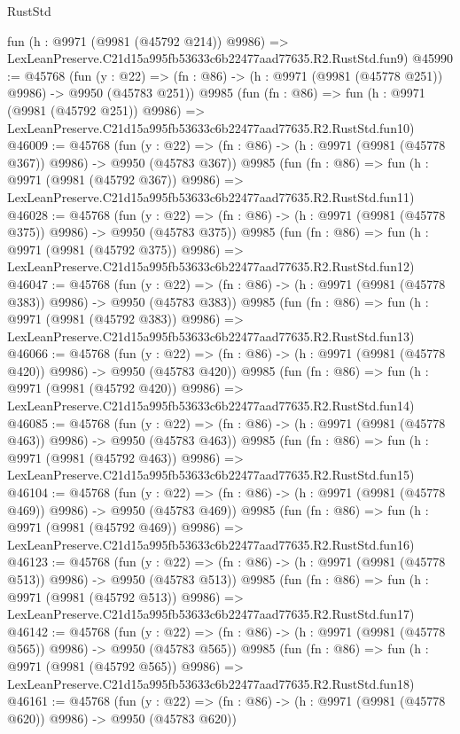 \begin{lexlean}{RustStd}
\begin{coremodule}
    fun (h : @9971 (@9981 (@45792 @214)) @9986) =>
    LexLeanPreserve.C21d15a995fb53633c6b22477aad77635.R2.RustStd.fun9)
@45990 := @45768
    (fun (y : @22) => (fn : @86) -> (h : @9971 (@9981 (@45778 @251)) @9986) -> @9950 (@45783 @251))
    @9985
    (fun (fn : @86) =>
    fun (h : @9971 (@9981 (@45792 @251)) @9986) =>
    LexLeanPreserve.C21d15a995fb53633c6b22477aad77635.R2.RustStd.fun10)
@46009 := @45768
    (fun (y : @22) => (fn : @86) -> (h : @9971 (@9981 (@45778 @367)) @9986) -> @9950 (@45783 @367))
    @9985
    (fun (fn : @86) =>
    fun (h : @9971 (@9981 (@45792 @367)) @9986) =>
    LexLeanPreserve.C21d15a995fb53633c6b22477aad77635.R2.RustStd.fun11)
@46028 := @45768
    (fun (y : @22) => (fn : @86) -> (h : @9971 (@9981 (@45778 @375)) @9986) -> @9950 (@45783 @375))
    @9985
    (fun (fn : @86) =>
    fun (h : @9971 (@9981 (@45792 @375)) @9986) =>
    LexLeanPreserve.C21d15a995fb53633c6b22477aad77635.R2.RustStd.fun12)
@46047 := @45768
    (fun (y : @22) => (fn : @86) -> (h : @9971 (@9981 (@45778 @383)) @9986) -> @9950 (@45783 @383))
    @9985
    (fun (fn : @86) =>
    fun (h : @9971 (@9981 (@45792 @383)) @9986) =>
    LexLeanPreserve.C21d15a995fb53633c6b22477aad77635.R2.RustStd.fun13)
@46066 := @45768
    (fun (y : @22) => (fn : @86) -> (h : @9971 (@9981 (@45778 @420)) @9986) -> @9950 (@45783 @420))
    @9985
    (fun (fn : @86) =>
    fun (h : @9971 (@9981 (@45792 @420)) @9986) =>
    LexLeanPreserve.C21d15a995fb53633c6b22477aad77635.R2.RustStd.fun14)
@46085 := @45768
    (fun (y : @22) => (fn : @86) -> (h : @9971 (@9981 (@45778 @463)) @9986) -> @9950 (@45783 @463))
    @9985
    (fun (fn : @86) =>
    fun (h : @9971 (@9981 (@45792 @463)) @9986) =>
    LexLeanPreserve.C21d15a995fb53633c6b22477aad77635.R2.RustStd.fun15)
@46104 := @45768
    (fun (y : @22) => (fn : @86) -> (h : @9971 (@9981 (@45778 @469)) @9986) -> @9950 (@45783 @469))
    @9985
    (fun (fn : @86) =>
    fun (h : @9971 (@9981 (@45792 @469)) @9986) =>
    LexLeanPreserve.C21d15a995fb53633c6b22477aad77635.R2.RustStd.fun16)
@46123 := @45768
    (fun (y : @22) => (fn : @86) -> (h : @9971 (@9981 (@45778 @513)) @9986) -> @9950 (@45783 @513))
    @9985
    (fun (fn : @86) =>
    fun (h : @9971 (@9981 (@45792 @513)) @9986) =>
    LexLeanPreserve.C21d15a995fb53633c6b22477aad77635.R2.RustStd.fun17)
@46142 := @45768
    (fun (y : @22) => (fn : @86) -> (h : @9971 (@9981 (@45778 @565)) @9986) -> @9950 (@45783 @565))
    @9985
    (fun (fn : @86) =>
    fun (h : @9971 (@9981 (@45792 @565)) @9986) =>
    LexLeanPreserve.C21d15a995fb53633c6b22477aad77635.R2.RustStd.fun18)
@46161 := @45768
    (fun (y : @22) => (fn : @86) -> (h : @9971 (@9981 (@45778 @620)) @9986) -> @9950 (@45783 @620))

\end{coremodule}
\end{lexlean}
